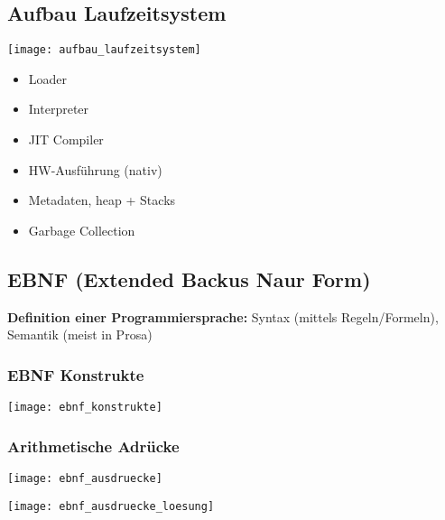 \subsection{Aufbau Laufzeitsystem}
\begin{minipage}{0,3\linewidth}
    \texttt{[image: aufbau\_laufzeitsystem]}
\end{minipage}
\begin{minipage}{0,7\linewidth}
    \begin{itemize}[topsep=0pt]
        \itemsep -0.2em
        \item Loader
        \item Interpreter
        \item JIT Compiler
        \item HW-Ausführung (nativ)
        \item Metadaten, heap + Stacks
        \item Garbage Collection
    \end{itemize}
\end{minipage}

\subsection{EBNF (Extended Backus Naur Form)}
\textbf{Definition einer Programmiersprache:} Syntax (mittels Regeln/Formeln), Semantik (meist in Prosa)
\subsubsection{EBNF Konstrukte}
\texttt{[image: ebnf\_konstrukte]}

\subsubsection{Arithmetische Adrücke}
\begin{minipage}{0,6\linewidth}
    \texttt{[image: ebnf\_ausdruecke]}
\end{minipage}
\begin{minipage}{0,4\linewidth}
    \texttt{[image: ebnf\_ausdruecke\_loesung]}
\end{minipage}
